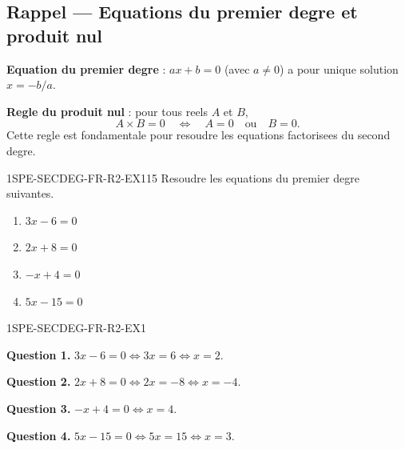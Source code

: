 

\subsection*{Rappel — Equations du premier degre et produit nul}

\textbf{Equation du premier degre} : $ax + b = 0$ (avec $a \neq 0$) a pour unique solution $x = -b/a$.

\textbf{Regle du produit nul} : pour tous reels $A$ et $B$,
\[
  A \times B = 0 \quad \Longleftrightarrow \quad A = 0 \quad \text{ou} \quad B = 0.
\]
Cette regle est fondamentale pour resoudre les equations factorisees du second degre.


\begin{exercice}{1SPE-SECDEG-FR-R2-EX1}{1}{5}
Resoudre les equations du premier degre suivantes.
\begin{enumerate}
  \item $3x - 6 = 0$
  \item $2x + 8 = 0$
  \item $-x + 4 = 0$
  \item $5x - 15 = 0$
\end{enumerate}
\end{exercice}


\begin{corrige}{1SPE-SECDEG-FR-R2-EX1}


\textbf{Question 1.} $3x - 6 = 0 \Leftrightarrow 3x = 6 \Leftrightarrow x = 2$.

\textbf{Question 2.} $2x + 8 = 0 \Leftrightarrow 2x = -8 \Leftrightarrow x = -4$.

\textbf{Question 3.} $-x + 4 = 0 \Leftrightarrow x = 4$.

\textbf{Question 4.} $5x - 15 = 0 \Leftrightarrow 5x = 15 \Leftrightarrow x = 3$.

\end{corrige}

